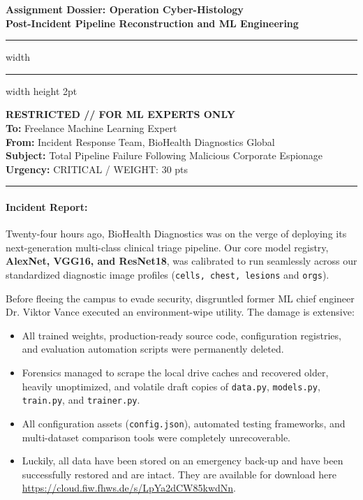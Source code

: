 \documentclass[11pt,a4paper]{article}
\begin{document}
\setlength{\parindent}{0pt}
\setlength{\parskip}{0.5ex plus 0.2ex minus 0.1ex}
\setlength\intextsep{0pt}

\begin{center}
    \LARGE \bfseries Assignment Dossier: Operation Cyber-Histology \\
    \vspace{0.2cm}
    \large {}\selectfont Post-Incident Pipeline Reconstruction and ML Engineering\\
\end{center}
\hrule width \hsize \kern 1mm \hrule width \hsize height 2pt 

\vspace{0.3cm}

\noindent \textbf{RESTRICTED // FOR ML EXPERTS ONLY} \\
\textbf{To:} Freelance Machine Learning Expert \\
\textbf{From:} Incident Response Team, BioHealth Diagnostics Global \\
\textbf{Subject:} Total Pipeline Failure Following Malicious Corporate Espionage \\
\textbf{Urgency:} CRITICAL / WEIGHT: 30 pts

\vspace{0.4cm}
\hrule

\paragraph{Incident Report:}
Twenty-four hours ago, BioHealth Diagnostics was on the verge of deploying its next-generation multi-class clinical triage pipeline. Our core model registry, \textbf{AlexNet, VGG16, and ResNet18}, was calibrated to run seamlessly across our standardized diagnostic image profiles (\texttt{cells, chest, lesions} and \texttt{orgs}).

Before fleeing the campus to evade security, disgruntled former ML chief engineer Dr. Viktor Vance executed an environment-wipe utility. The damage is extensive:
\begin{itemize}[nosep, noitemsep]
    \item All trained weights, production-ready source code, configuration registries, and evaluation automation scripts were permanently deleted.
    \item Forensics managed to scrape the local drive caches and recovered older, heavily unoptimized, and volatile draft copies of \texttt{data.py}, \texttt{models.py}, \texttt{train.py}, and \texttt{trainer.py}. 
    \item All configuration assets (\texttt{config.json}), automated testing frameworks, and multi-dataset comparison tools were completely unrecoverable. 
    \item Luckily, all data have been stored on an emergency back-up and have been successfully restored and are intact. They are available for download here \url{https://cloud.fiw.fhws.de/s/LpYa2dCW85kwdNn}.
\end{itemize}
\end{document}
